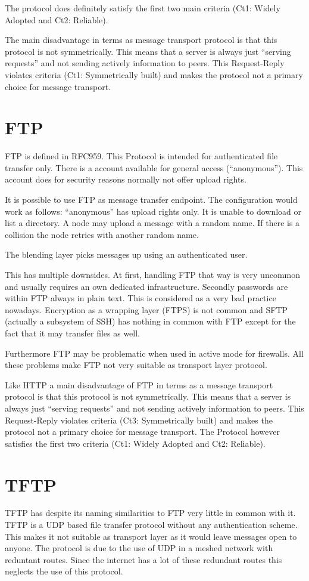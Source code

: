 \documentclass[a4paper,appendixprefix,pdfusetitle,twocolumn,fontsize=8pt,attachdocs,draft,status=draft]{scrbook}
\begin{document}
The protocol does definitely satisfy the first two main criteria (Ct1: Widely Adopted and Ct2: Reliable).

The main disadvantage in terms as message transport protocol is that this protocol is not symmetrically. This means that a server is always just ``serving requests'' and not sending actively information to peers. This Request-Reply violates criteria (Ct1: Symmetrically built) and makes the protocol not a primary choice for  message transport. 

\section{FTP}
FTP is defined in RFC959\cite{RFC959}. This Protocol is intended for authenticated file transfer only. There is a account available for general access (``anonymous''). This account does for security reasons normally not offer upload rights.

It is possible to use FTP as message transfer endpoint. The configuration would work as follows: ``anonymous'' has upload rights only. It is unable to download or list a directory. A node may upload a message with a random name. If there is a collision the node retries with another random name.

The blending layer picks messages up using an authenticated user.

This has multiple downsides. At first, handling FTP that way is very uncommon and usually requires an own dedicated infrastructure. Secondly passwords are within FTP always in plain text. This is considered as a very bad practice nowadays. Encryption as a wrapping layer (FTPS) is not common and SFTP (actually a subsystem of SSH) has nothing in common with FTP except for the fact that it may transfer files as well.

Furthermore FTP may be problematic when used in active mode for firewalls. All these problems make FTP not very suitable as transport layer protocol.

Like HTTP a main disadvantage of FTP in terms as a message transport protocol is that this protocol is not symmetrically. This means that a server is always just ``serving requests'' and not sending actively information to peers. This Request-Reply violates criteria (Ct3: Symmetrically built) and makes the protocol not a primary choice for  message transport. The Protocol however satisfies the first two criteria  (Ct1: Widely Adopted and Ct2: Reliable).

\section{TFTP}
TFTP has despite its naming similarities to FTP very little in common with it. TFTP is a UDP based file transfer protocol without any authentication scheme. This makes it not suitable as transport layer as it would leave messages open to anyone. The protocol is due to the use of UDP in a meshed network with reduntant routes. Since the internet has a lot of these redundant routes this neglects the use of this protocol.
\end{document}
